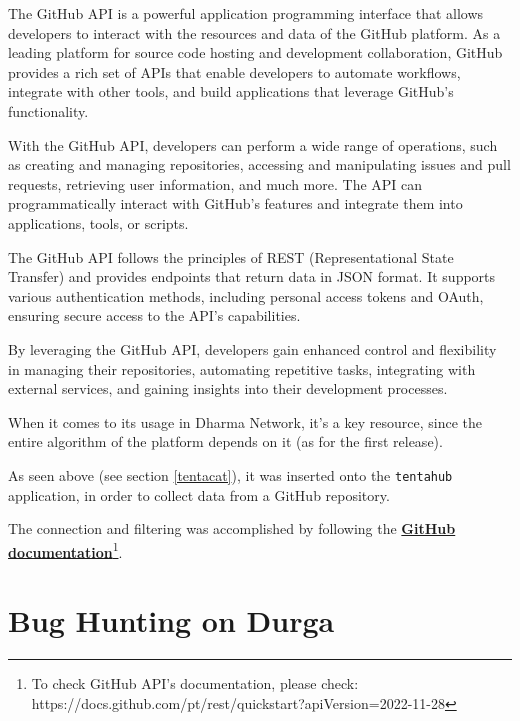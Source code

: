The GitHub API is a powerful application programming interface that allows developers to interact with the resources and data of the GitHub platform. As a leading platform for source code hosting and development collaboration, GitHub provides a rich set of APIs that enable developers to automate workflows, integrate with other tools, and build applications that leverage GitHub's functionality.\newline

With the GitHub API, developers can perform a wide range of operations, such as creating and managing repositories, accessing and manipulating issues and pull requests, retrieving user information, and much more. The API can programmatically interact with GitHub's features and integrate them into applications, tools, or scripts.\newline

The GitHub API follows the principles of REST (Representational State Transfer) and provides endpoints that return data in JSON format. It supports various authentication methods, including personal access tokens and OAuth, ensuring secure access to the API's capabilities.\newline

By leveraging the GitHub API, developers gain enhanced control and flexibility in managing their repositories, automating repetitive tasks, integrating with external services, and gaining insights into their development processes.\newline

When it comes to its usage in Dharma Network, it's a key resource, since the entire algorithm of the platform depends on it (as for the first release).\newline

As seen above (see section \ref{tentacat}), it was inserted onto the \texttt{tentahub} application, in order to collect data from a GitHub repository. 

The connection and filtering was accomplished by following the \href{https://docs.github.com/pt/rest/quickstart?apiVersion=2022-11-28}{\textbf{GitHub documentation}}\footnote{To check GitHub API's documentation, please check: https://docs.github.com/pt/rest/quickstart?apiVersion=2022-11-28}.

\section{Bug Hunting on Durga}\label{bug}

